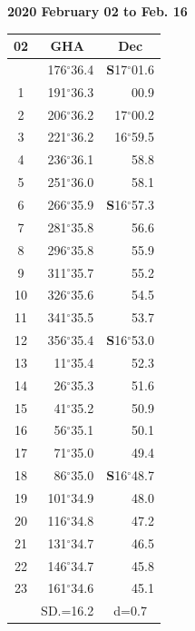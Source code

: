 \documentclass[10pt, a4paper]{report}
\begin{document}
\newpage
\sffamily
\noindent
\begin{flushright}
\textbf{2020 February 02 to Feb. 16}\par
\end{flushright}
\begin{scriptsize}
\noindent
\begin{tabular*}{0.2\textwidth}[t]{@{\extracolsep{\fill}}|c|rr|}
\hline
\multicolumn{1}{|c|}{\rule{0pt}{2.6ex}\textbf{02}} & \multicolumn{1}{c}{\textbf{GHA}} & \multicolumn{1}{c|}{\textbf{Dec}}\\
\hline\rule{0pt}{2.6ex}\noindent
0 & 176$^\circ$36.4 & \textbf{S}17$^\circ$01.6\\
1 & 191$^\circ$36.3 & 00.9\\
2 & 206$^\circ$36.2 & 17$^\circ$00.2\\
3 & 221$^\circ$36.2 & 16$^\circ$59.5\\
4 & 236$^\circ$36.1 & 58.8\\
5 & 251$^\circ$36.0 & 58.1\\[2Pt]
6 & 266$^\circ$35.9 & \textbf{S}16$^\circ$57.3\\
7 & 281$^\circ$35.8 & 56.6\\
8 & 296$^\circ$35.8 & 55.9\\
9 & 311$^\circ$35.7 & \raisebox{0.24ex}{\boldmath$\cdot$~\boldmath$\cdot$~~}55.2\\
10 & 326$^\circ$35.6 & 54.5\\
11 & 341$^\circ$35.5 & 53.7\\[2Pt]
12 & 356$^\circ$35.4 & \textbf{S}16$^\circ$53.0\\
13 & 11$^\circ$35.4 & 52.3\\
14 & 26$^\circ$35.3 & 51.6\\
15 & 41$^\circ$35.2 & \raisebox{0.24ex}{\boldmath$\cdot$~\boldmath$\cdot$~~}50.9\\
16 & 56$^\circ$35.1 & 50.1\\
17 & 71$^\circ$35.0 & 49.4\\[2Pt]
18 & 86$^\circ$35.0 & \textbf{S}16$^\circ$48.7\\
19 & 101$^\circ$34.9 & 48.0\\
20 & 116$^\circ$34.8 & 47.2\\
21 & 131$^\circ$34.7 & \raisebox{0.24ex}{\boldmath$\cdot$~\boldmath$\cdot$~~}46.5\\
22 & 146$^\circ$34.7 & 45.8\\
23 & 161$^\circ$34.6 & 45.1\\
\hline
\rule{0pt}{2.4ex} & \multicolumn{1}{c}{SD.=16.2} & \multicolumn{1}{c|}{d=0.7}\\

\end{tabular*}
\end{scriptsize}
\end{document}
